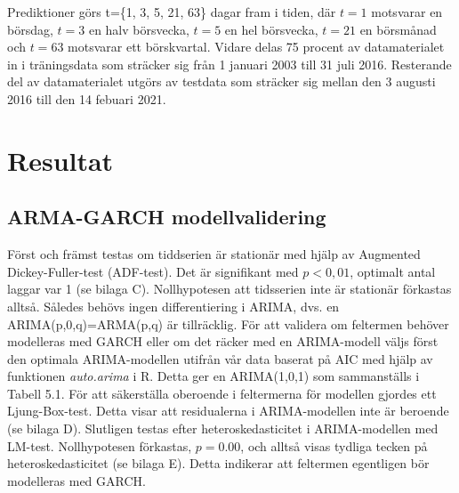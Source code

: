 \documentclass[11pt]{article}
\numberwithin{equation}{section}
\numberwithin{table}{section}
\numberwithin{figure}{section}
\begin{document}

Prediktioner görs t=\{1, 3, 5, 21, 63\} dagar fram i tiden, där $t=1$ motsvarar en börsdag,  $t=3$ en halv börsvecka, $t=5$ en hel börsvecka, $t=21$ en börsmånad och $t=63$ motsvarar ett börskvartal. Vidare delas 75 procent av datamaterialet in i träningsdata som sträcker sig från 1 januari 2003 till 31 juli 2016. Resterande del av datamaterialet utgörs av testdata som sträcker sig mellan den 3 augusti 2016 till den 14 febuari 2021. 

\newpage
\section{Resultat}
\subsection{ARMA-GARCH modellvalidering}
Först och främst testas om tiddserien är stationär med hjälp av Augmented Dickey-Fuller-test (ADF-test). Det är signifikant med $p<0,01$, optimalt antal laggar var 1 (se bilaga C). Nollhypotesen att tidsserien inte är stationär förkastas alltså. Således behövs ingen differentiering i ARIMA, dvs. en ARIMA(p,0,q)=ARMA(p,q) är tillräcklig. För att validera om feltermen behöver modelleras med GARCH eller om det räcker med en ARIMA-modell väljs först den optimala ARIMA-modellen utifrån vår data baserat på AIC med hjälp av funktionen \textit{auto.arima} i R. Detta ger en ARIMA(1,0,1) som sammanställs i Tabell 5.1. För att säkerställa oberoende i feltermerna för modellen gjordes ett Ljung-Box-test. Detta visar att residualerna i ARIMA-modellen inte är beroende (se bilaga D). Slutligen testas efter heteroskedasticitet i ARIMA-modellen med LM-test. Nollhypotesen förkastas, $p=0.00$, och alltså visas tydliga tecken på heteroskedasticitet (se bilaga E). Detta indikerar att feltermen egentligen bör modelleras med GARCH. 
\end{document}
